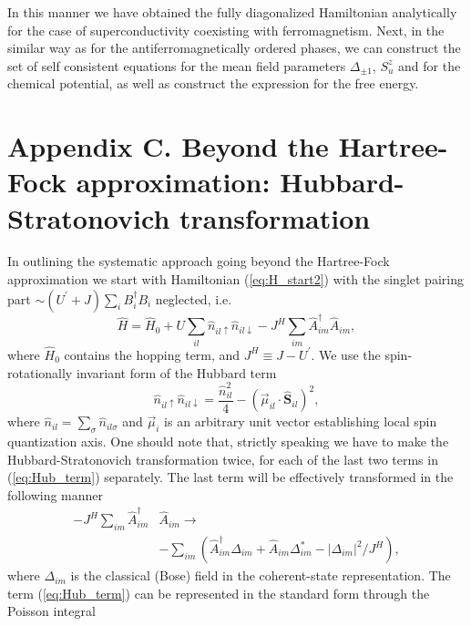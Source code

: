 \documentclass[aps,prb,showpacs,reprint]{revtex4-1}
\begin{document}
In this manner we have obtained the fully diagonalized Hamiltonian analytically for the case
of superconductivity coexisting with ferromagnetism. Next, in the similar way as
for the antiferromagnetically ordered phases, we can construct the set of self
consistent equations for the mean field parameters $\Delta_{\pm 1}$, $S^z_u$ and
for the chemical potential, as well as construct the expression for the free energy.

\section*{Appendix C. Beyond the Hartree-Fock approximation: Hubbard-Stratonovich transformation}

In outlining the systematic approach going beyond the Hartree-Fock approximation we start with Hamiltonian (\ref{eq:H_start2}) with
the singlet pairing part $\sim (U^{\prime}+J)\sum_{i}B_i^{\dagger}B_i$
neglected,
i.e.
\begin{equation}
\hat{H}=\hat{H}_0
+ U\sum_{il}\hat{n}_{il\uparrow}\hat{n}_{
il\downarrow}-J^H\sum_ {im}\hat{A}^{\dagger}_{im} \hat{A}_{im},
\label{eq:H_start_ApC}
\end{equation}
where $\hat{H}_0$ contains the hopping term, and $J^H\equiv J-U^{\prime}$. We
use the spin-rotationally invariant form of the Hubbard term
\begin{equation}
\hat{n}_{il\uparrow}\hat{n}_{il\downarrow}=\frac{\hat{n}^2_{il}}{4}-(\vec{\mu}
_{il} \cdotp
\mathbf{\hat{S}}_{il} )^2,
\label{eq:Hub_term}
\end{equation}
where $\hat{n}_{il}=\sum_{\sigma}\hat{n}_{il\sigma}$ and $\vec{\mu}_i$ is an
arbitrary unit vector establishing local spin quantization axis. One should note
that, strictly speaking we have to make the Hubbard-Stratonovich transformation
twice, for each of the last two terms in (\ref{eq:Hub_term}) separately. The
last term will be effectively transformed in the following manner
\begin{equation}
\begin{split}
-J^H\sum_ {im}\hat{A}^{\dagger}_{im}& \hat{A}_{im} \rightarrow \\
&-\sum_{im}(\hat{A}_{im}^{\dagger}\Delta_{im}+\hat{A}_{im}\Delta_{im}^* -
|\Delta_{im}|^2/J^{H}),
\end{split}
\end{equation}
where $\Delta_{im}$ is the classical (Bose) field in the coherent-state representation. The term (\ref{eq:Hub_term}) can be represented in the standard form through the Poisson integral
\end{document}
